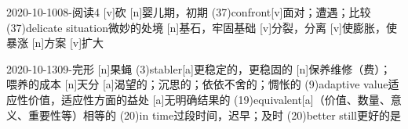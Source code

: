 \documentclass[12pt]{ctexart}
\begin{document}
\begin{wordlist}{2020-10-10}{08-阅读4}
  [v]{砍}
  [n]{婴儿期，初期}
  \word(37){confront}[v]{面对；遭遇；比较}
  \word(37){delicate situation}{微妙的处境}
  [n]{基石，牢固基础}
  [v]{分裂，分离}
  [v]{使膨胀，使暴涨}
  [n]{方案}
  [v]{扩大}
\end{wordlist}
\begin{wordlist}{2020-10-13}{09-完形}
  [n]{果蝇}
  \word(3){stabler}[a]{更稳定的，更稳固的}
  [n]{保养维修（费）；喂养的成本}
  [n]{天分}
  [a]{渴望的；沉思的；依依不舍的；惆怅的}
  \word(9){adaptive value}{适应性价值，适应性方面的益处}
  [a]{无明确结果的}
  \word(19){equivalent}[a]{（价值、数量、意义、重要性等）相等的}
  \word(20){in time}{过段时间，迟早；及时}
  \word(20){better still}{更好的是}
\end{wordlist}
\end{document}
